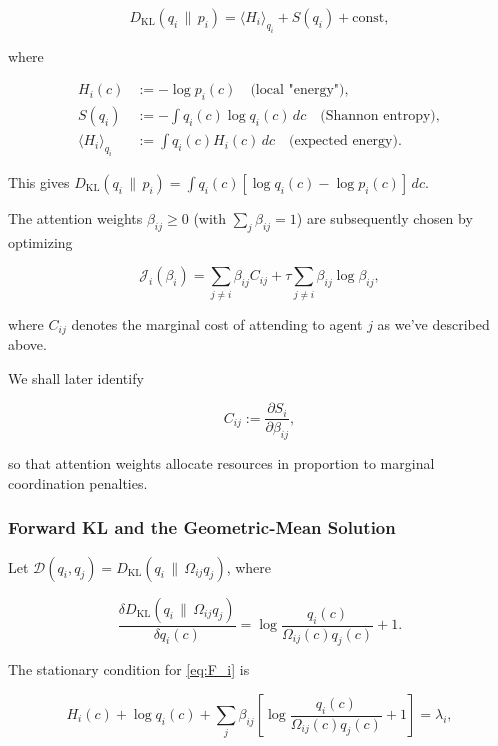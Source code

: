 \documentclass[twoside,11pt]{article}
\begin{document}
\begin{equation}
D_{\mathrm{KL}}(q_i \,\|\, p_i) = \langle H_i \rangle_{q_i} + S(q_i) + \text{const},
\end{equation}

where

\begin{align}
H_i(c) &:= -\log p_i(c) \quad \text{(local "energy")}, \\
S(q_i) &:= -\int q_i(c) \log q_i(c)\,dc \quad \text{(Shannon entropy)}, \\
\langle H_i \rangle_{q_i} &:= \int q_i(c) H_i(c)\,dc \quad \text{(expected energy)}.
\end{align}

This gives $D_{\mathrm{KL}}(q_i \,\|\, p_i) = \int q_i(c)[\log q_i(c) - \log p_i(c)]\,dc$.

The attention weights $\beta_{ij}\ge 0$ (with $\sum_j \beta_{ij}=1$) are subsequently chosen by optimizing

\begin{equation}
\mathcal{J}_i(\beta_i)
=\sum_{j\neq i}\beta_{ij} C_{ij}
+ \tau \sum_{j\neq i}\beta_{ij}\log\beta_{ij},
\label{eq:J_i}
\end{equation}

where $C_{ij}$ denotes the marginal cost of attending to agent $j$ as we've described above.

We shall later identify

\begin{equation}
C_{ij} := \frac{\partial S_i}{\partial \beta_{ij}},
\end{equation}

so that attention weights allocate resources in proportion to marginal coordination penalties.

\subsubsection{Forward KL and the Geometric-Mean Solution}
Let $\mathcal{D}(q_i,q_j) = D_{\mathrm{KL}}(q_i \,\|\, \Omega_{ij} q_j)$, where

\[
\frac{\delta D_{\mathrm{KL}}(q_i \,\|\, \Omega_{ij} q_j)}{\delta q_i(c)} 
= \log\frac{q_i(c)}{\Omega_{ij}(c) q_j(c)} + 1.
\]

The stationary condition for \eqref{eq:F_i} is

\begin{equation}
H_i(c)
+ \log q_i(c)
+ \sum_j \beta_{ij}
\!\left[
\log\frac{q_i(c)}{\Omega_{ij}(c)q_j(c)}+1
\right]
= \lambda_i,
\end{equation}
\end{document}
